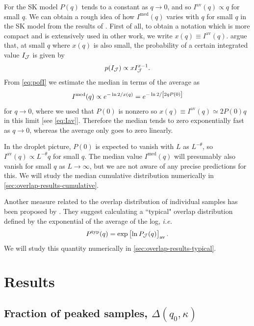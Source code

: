 For the SK model $P(q)$ tends to a constant as $q \to 0$, and so
$I^{\mathrm{av}}(q) \propto q$ for small $q$. We can obtain a rough idea of how
$I^{\mathrm{med}}(q)$ varies with $q$ for small $q$ in the SK model from the
results of \textcite{mezard1984nature}. First of all, to obtain a notation
which is more compact and is extensively used in other work, we write $x(q)
\equiv I^{\mathrm{av}}(q)$. \textcite{mezard1984nature} argue that, at small
$q$ where $x(q)$ is also small, the probability of a certain integrated value
$I_{\mathcal{J}}$ is given by
\begin{equation}
  p(I_{\mathcal{J}}) \propto x I_{\mathcal{J}}^{x-1}.
  \label{eq:pofI}
\end{equation}
From \cref{eq:pofI} we estimate the median in terms of the average as
\begin{equation}
  I^{\mathrm{med}}(q) \propto e^{-\ln 2 / x(q)} = e^{-\ln 2/\left[2 q P(0)\right]}
  \label{eq:median-small-q}
\end{equation}
for $q \to 0$, where we used that $P(0)$ is nonzero so $x(q) \equiv
I^{\mathrm{av}}(q) \simeq 2 P(0) q$ in this limit [see \cref{eq:Iav}].
Therefore the median tends to zero exponentially fast as $q \to 0$, whereas the
average only goes to zero linearly.

In the droplet picture, $P(0)$ is expected to vanish with $L$ as $L^{-\theta}$,
so $I^{\mathrm{av}}(q) \propto L^{-\theta} q$ for small $q$.
The median value $I^{\mathrm{med}}(q)$ will presumably also vanish for small $q$
as $L \to \infty$, but we are not aware of any precise predictions for this.
We will study the median cumulative distribution numerically in
\cref{sec:overlap-results-cumulative}.

Another measure related to the overlap distribution of individual samples has
been proposed by \textcite{monthus2013typical}. They suggest calculating a
``typical" overlap distribution defined by the exponential of the average of
the log, \emph{i.e.}
\begin{equation}
  P^{\mathrm{typ}}(q) = \exp\left[\ln P_{\mathcal{J}}(q)\right]_{\mathrm{av}}.
  \label{eq:pofq-typical}
\end{equation}
We will study this quantity numerically in \cref{sec:overlap-results-typical}.



\section{Results}

\subsection{Fraction of peaked samples, $\Delta(q_0,\kappa)$}
\label{sec:overlap-results-delta}

